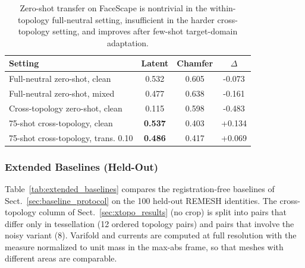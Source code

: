 \begin{table}[!ht]
\centering
\footnotesize
\caption{Zero-shot transfer on FaceScape is nontrivial in the within-topology full-neutral setting, insufficient in the harder cross-topology setting, and improves after few-shot target-domain adaptation.}
\label{tab:faceverse_summary}
\begin{tabular}{lccc}
\toprule
Setting & Latent & Chamfer & $\Delta$ \\
\midrule
Full-neutral zero-shot, clean & 0.532 & 0.605 & -0.073 \\
Full-neutral zero-shot, mixed & 0.477 & 0.638 & -0.161 \\
Cross-topology zero-shot, clean & 0.115 & 0.598 & -0.483 \\
75-shot cross-topology, clean & \textbf{0.537} & 0.403 & +0.134 \\
75-shot cross-topology, trans. 0.10 & \textbf{0.486} & 0.417 & +0.069 \\
\bottomrule
\end{tabular}
\end{table}


\subsubsection{Extended Baselines (Held-Out)}
\label{sec:extended_baselines}
Table~\ref{tab:extended_baselines} compares the registration-free baselines of Sect.~\ref{sec:baseline_protocol} on the 100 held-out REMESH identities. The cross-topology column of Sect.~\ref{sec:xtopo_results} (no crop) is split into pairs that differ only in tessellation (12 ordered topology pairs) and pairs that involve the noisy variant (8). Varifold and currents are computed at full resolution with the measure normalized to unit mass in the max-abs frame, so that meshes with different areas are comparable.


